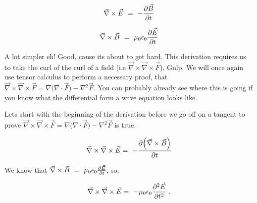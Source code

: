 \documentclass{article}
\begin{document}
\begin{equation} \label{eb-eq-1002-1}
\vec{\nabla} \times \vec{E} \hspace{0.125cm} = \hspace{0.125cm} -\frac{\partial{\vec{B}}}{\partial{t}}
\end{equation}

\begin{equation} \label{eb-eq-1003-1}
\vec{\nabla} \times \vec{B} \hspace{0.125cm} = \hspace{0.125cm} \mu_0\epsilon_0\frac{\partial{\vec{E}}}{\partial{t}}
\end{equation}

A lot simpler eh! Good, cause its about to get hard. This derivation requires us to take the curl of the curl of a field (i.e \begin{math} \vec{\nabla}\times\vec{\nabla}\times\vec{F} \end{math}). Gulp. We will once again use tensor calculus to perform a necessary proof, that \begin{math} \vec{\nabla}\times\vec{\nabla}\times\vec{F} = \nabla\big(\nabla\cdot\vec{F}\big) - \nabla^{2}\vec{F} \end{math}. You can probably already see where this is going if you know what the differential form a wave equation looks like. 

Lets start with the beginning of the derivation before we go off on a tangent to prove \begin{math} \vec{\nabla}\times\vec{\nabla}\times\vec{F} = \nabla\big(\nabla\cdot\vec{F}\big) - \nabla^{2}\vec{F} \end{math} is true. 

\begin{equation} \label{eb-eq-1002-2}
\vec{\nabla}\times\vec{\nabla}\times\vec{E} = \hspace{0.125cm} -\frac{\partial{\Big(\vec{\nabla}\times\vec{B}\Big)}}{\partial{t}}
\end{equation}

We know that \begin{math} \vec{\nabla} \times \vec{B} \hspace{0.125cm} = \hspace{0.125cm} \mu_0\epsilon_0\frac{\partial{\vec{E}}}{\partial{t}} \end{math}, so;

\begin{equation} \label{eb-eq-1002-3}
\vec{\nabla}\times\vec{\nabla}\times\vec{E} = \hspace{0.125cm} -\mu_{0}\epsilon_{0}\frac{\partial^{2}{\vec{E}}}{\partial{t}^{2}} \hspace{0.125cm}. 
\end{equation}
\end{document}
